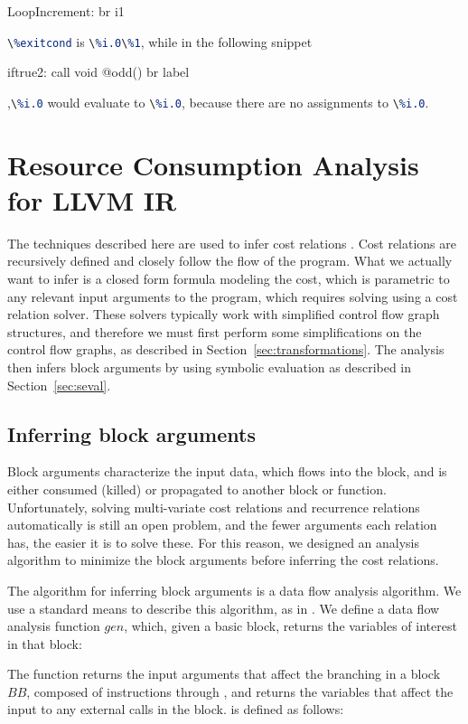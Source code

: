 \documentclass[9pt,preprint]{sigplanconf}
\newcommand{\mathspace}[1]{\ensuremath{#1}\xspace}
\newcommand{\aBlock}{\mathspace{\mathit{BB}}}
\newcommand{\Gen}{\mathspace{\mathit{gen}}}
\newcommand{\seclabel}[1]{\label{sec:#1}}
\newcommand{\secref}[1]{Section~\ref{sec:#1}}
\newcommand\llvminline[1]{\lstinline[language=LLVM]{#1}}
\begin{document}
\begin{llvmcode}
  LoopIncrement:
br i1 \end{llvmcode}
\llvminline{\%exitcond} is \llvminline{\%i.0}\llvminline{\%1}, while in the following snippet

\begin{llvmcode}
  iftrue2:
    call void @odd()
    br label \end{llvmcode}
,\llvminline{\%i.0} would evaluate to \llvminline{\%i.0},
because there are no assignments to \llvminline{\%i.0}.


\section{Resource Consumption Analysis for LLVM IR}\seclabel{resourceanalysis}
The techniques described here are used to infer cost relations
\cite{AlbertAGP11a}. Cost relations are recursively defined and closely follow the flow of the
program. What we actually want to infer is a closed form formula modeling the
cost, which is parametric to any relevant input arguments to the program, which
requires solving using a cost relation solver. These solvers typically work with
simplified control flow graph structures, and therefore we must first perform some
simplifications on the control flow graphs, as described in
\secref{transformations}. The analysis then infers block arguments by using
symbolic evaluation as described in \secref{seval}.

\subsection{Inferring block arguments}
Block arguments characterize the input data, which flows into the block, and is
either consumed (killed) or propagated to another block or function. Unfortunately, solving multi-variate cost relations
and recurrence relations automatically is still an open problem, and the fewer
arguments each relation has, the easier it is to solve these. For this reason,
we designed an analysis algorithm to minimize the block arguments before
inferring the cost relations.

The algorithm for inferring block arguments is a data flow analysis
algorithm. We use a standard means to describe this algorithm, as in
\cite{Nielson99}.
We define a data flow analysis function \Gen,
which, given a basic block, returns the variables of interest in that block:

The function  returns the input arguments that affect the branching in a block
\aBlock, composed of instructions 
through , and  returns the variables that affect the input to any
external calls in the block.  is defined as follows:
\end{document}
